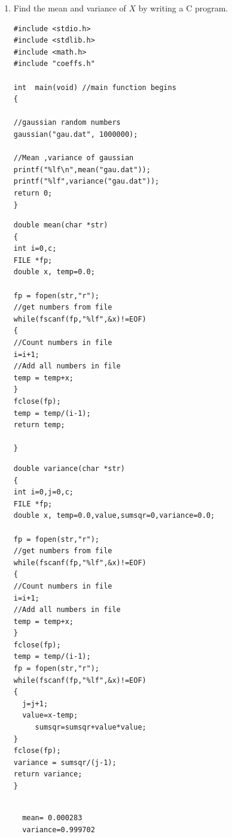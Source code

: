 \documentclass[10pt, a4paper]{article}
\begin{document}
\begin{enumerate}
 \item Find the mean and variance of $X$ by writing a C program.
\begin{lstlisting}
#include <stdio.h>
#include <stdlib.h>
#include <math.h>
#include "coeffs.h"

int  main(void) //main function begins
{
 
//gaussian random numbers
gaussian("gau.dat", 1000000);

//Mean ,variance of gaussian
printf("%lf\n",mean("gau.dat"));
printf("%lf",variance("gau.dat"));
return 0;
}
\end{lstlisting}
\begin{lstlisting}
double mean(char *str)
{
int i=0,c;
FILE *fp;
double x, temp=0.0;

fp = fopen(str,"r");
//get numbers from file
while(fscanf(fp,"%lf",&x)!=EOF)
{
//Count numbers in file
i=i+1;
//Add all numbers in file
temp = temp+x;
}
fclose(fp);
temp = temp/(i-1);
return temp;

}
\end{lstlisting}
\begin{lstlisting}
double variance(char *str)
{
int i=0,j=0,c;
FILE *fp;
double x, temp=0.0,value,sumsqr=0,variance=0.0;

fp = fopen(str,"r");
//get numbers from file
while(fscanf(fp,"%lf",&x)!=EOF)
{
//Count numbers in file
i=i+1;
//Add all numbers in file
temp = temp+x;
}
fclose(fp);
temp = temp/(i-1);
fp = fopen(str,"r");
while(fscanf(fp,"%lf",&x)!=EOF)
{
  j=j+1;
  value=x-temp;
     sumsqr=sumsqr+value*value;
}
fclose(fp);
variance = sumsqr/(j-1);
return variance;
}


\end{lstlisting}

\begin{lstlisting}
  mean= 0.000283
  variance=0.999702
\end{lstlisting}

\begin{center}
\end{center}


\end{enumerate}
\end{document}
